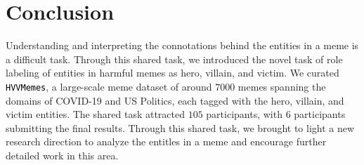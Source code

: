 \documentclass[11pt]{article}
\newcommand{\dataset}{\textcolor{black}{\texttt{HVVMemes}}}
\newcommand{\model}{\texttt{MeRaiM}}
\begin{document}
\section{Conclusion}
Understanding and interpreting the connotations behind the entities in a meme is a difficult task. Through this shared task, we introduced the novel task of role labeling of entities in harmful memes as hero, villain, and victim. We curated \dataset, a large-scale meme dataset of around $7000$ memes spanning the domains of COVID-19 and US Politics, each tagged with the hero, villain, and victim entities. The shared task attracted $105$ participants, with $6$ participants submitting the final results. Through this shared task, we brought to light a new research direction to analyze the entitles in a meme and encourage further detailed work in this area.








\end{document}
